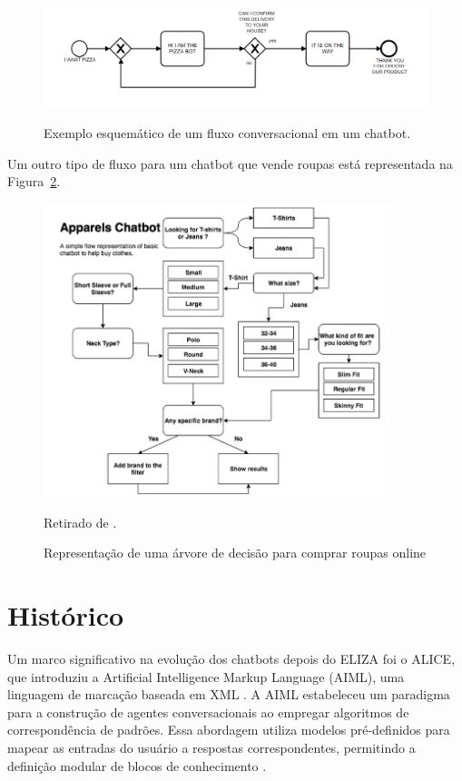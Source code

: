 \documentclass[14pt,a4paper,oneside]{book}
\begin{document}
\begin{figure}
	\centering
	\caption{Exemplo esquemático de um fluxo conversacional em um chatbot.}
	\includegraphics[width=1\linewidth]{./fig/fluxo.png}
	\label{fig:fluxo}
\end{figure}

Um outro tipo de fluxo para um chatbot que vende roupas está representada na Figura~\ref{fig:representacaodeumaarvore}.

\begin{figure}
\caption{Representação de uma árvore de decisão para comprar roupas online}
\vspace{0.5cm}
    \centering
   	\vspace*{0,2cm}
    \includegraphics[width=0.9\textwidth]{./fig/image14.png}
    \label{fig:representacaodeumaarvore}
	{
	
	Retirado de \cite{Raj2019}.}
\end{figure}

\section{Histórico}

Um marco significativo na evolução dos chatbots depois do ELIZA foi o ALICE, que introduziu a Artificial Intelligence Markup Language (AIML), uma linguagem de marcação baseada em XML \cite{Wallace2000}. 
A AIML estabeleceu um paradigma para a construção de agentes conversacionais ao empregar algoritmos de correspondência de padrões. 
Essa abordagem utiliza modelos pré-definidos para mapear as entradas do usuário a respostas correspondentes, permitindo a definição modular de blocos de conhecimento \cite{Wallace2000}.
\end{document}

